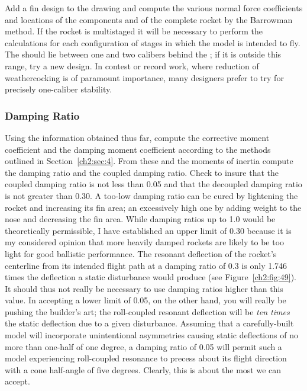 Add a fin design to the drawing and compute the various normal force
coefficients and \CP{} locations of the components and of the complete rocket
by the Barrowman method. If the rocket is multistaged it will be necessary to
perform the calculations for each configuration of stages in which the model
is intended to fly. The \CP{} should lie between one and two calibers behind
the \CG; if it is outside this range, try a new design. In contest or record
work, where reduction of weathercocking is of paramount importance, many
designers prefer to try for precisely one-caliber stability.

\subsubsection{Damping Ratio}\label{ch2:sec:6.4.3}

Using the information obtained thus far, compute the corrective moment
coefficient and the damping moment coefficient according to the methods
outlined in Section~\ref{ch2:sec:4}. From these and the moments of inertia
compute the damping ratio and the coupled damping ratio. Check to insure that
the coupled damping ratio is not less than 0.05 and that the decoupled
damping ratio is not greater than 0.30. A too-low damping ratio can be cured
by lightening the rocket and increasing its fin area; an excessively high one
by adding weight to the nose and decreasing the fin area. While damping
ratios up to 1.0 would be theoretically permissible, I have established an
upper limit of 0.30 because it is my considered opinion that more heavily
damped rockets are likely to be too light for good ballistic performance. The
resonant deflection of the rocket's centerline from its intended flight path
at a damping ratio of 0.3 is only 1.746 times the deflection a static
disturbance would produce (see Figure~\ref{ch2:fig:49}). It should thus not
really be necessary to use damping ratios higher than this value. In
accepting a lower limit of 0.05, on the other hand, you will really be
pushing the builder's art; the roll-coupled resonant deflection will be
\emph{ten times} the static deflection due to a given disturbance. Assuming
that a carefully-built model will incorporate unintentional asymmetries
causing static deflections of no more than one-half of one degree, a damping
ratio of 0.05 will permit such a model experiencing roll-coupled resonance to
precess about its flight direction with a cone half-angle of five degrees.
Clearly, this is about the most we can accept.

